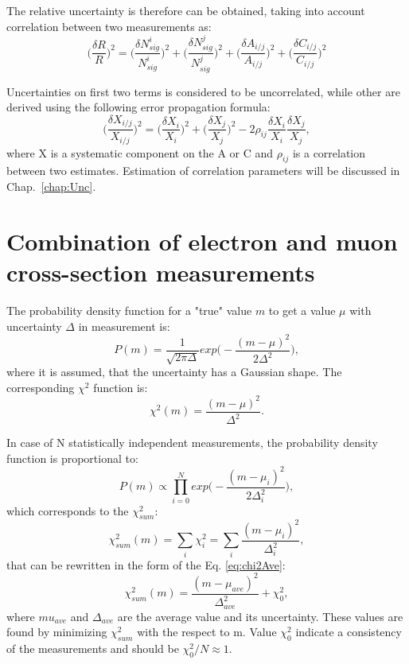 The relative uncertainty is therefore can be obtained, taking into account correlation between two measurements as:
\begin{equation}
\Big(\frac{\delta R }{R}\Big)^2=\Big(\frac{\delta N^{i}_{sig}}{N^{i}_{sig}}\Big)^2+\Big(\frac{\delta N^{j}_{sig}}{N^{j}_{sig}}\Big)^2+\Big(\frac{\delta A_{i/j}}{A_{i/j}}\Big)^2+\Big(\frac{\delta C_{i/j}}{C_{i/j}}\Big)^2
\end{equation}

Uncertainties on first two terms is considered to be uncorrelated, while other are derived using the following error propagation formula:
\begin{equation}
\Big(\frac{\delta X_{i/j} }{X_{i/j}}\Big)^2= \Big(\frac{\delta X_{i} }{X_{i}}\Big)^2+\Big(\frac{\delta X_{j} }{X_{j}}\Big)^2-2\rho_{ij}\frac{\delta X_{i}}{X_{i}}\frac{\delta X_{j}}{X_{j}},
\end{equation}
where X is a systematic component on the A or C and $\rho_{ij}$ is a correlation between two estimates. Estimation of correlation parameters will be discussed in Chap.~\ref{chap:Unc}.

\section{Combination of electron and muon cross-section measurements}\label{sec:Aver}

The probability density function for a "true" value $m$ to get a value $\mu$ with uncertainty $\Delta$ in measurement is:
\begin{equation}
P(m)=\frac{1}{\sqrt{2\pi\Delta}}exp\Big(-\frac{(m-\mu)^2}{2\Delta^2}\Big),
\end{equation}
where it is assumed, that the uncertainty has a Gaussian shape. The corresponding $\chi^2$ function is:
\begin{equation}\label{eq:chi2Ave}
\chi^2(m) = \frac{(m-\mu)^2}{\Delta^2}.
\end{equation}

In case of N statistically independent measurements, the probability density function is proportional to:
\begin{equation}
P(m)\propto \prod_{i=0}^{N} exp\Big(-\frac{(m-\mu_i)^2}{2\Delta_i^2}\Big),
\end{equation}
which corresponds to the $\chi_{sum}^2$:
\begin{equation}
\chi_{sum}^2(m) = \sum_{i} \chi^2_i = \sum_{i} \frac{(m-\mu_i)^2}{\Delta_i^2}, 
\end{equation}
that can be rewritten in the form of the Eq. \ref{eq:chi2Ave}:
\begin{equation}\label{eq:chi2Sum}
\chi_{sum}^2(m) =\frac{(m-\mu_{ave})^2}{\Delta_{ave}^2}+\chi^{2}_{0}, 
\end{equation}
where $mu_{ave}$ and $\Delta_{ave}$ are the average value and its uncertainty.  These values are found by minimizing $\chi^{2}_{sum}$ with the respect to m. Value $\chi^2_0$ indicate a consistency of the measurements and should be $\chi^2_0/N \approx 1$.

